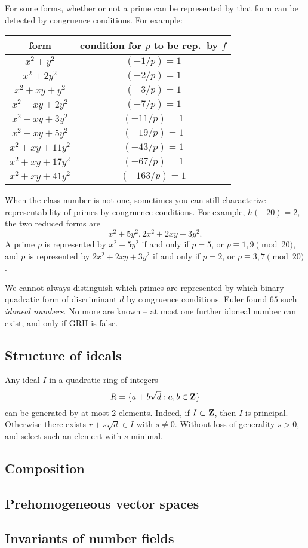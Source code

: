 For some forms, whether or not a prime can be represented by that form can 
be detected by congruence conditions. For example: 
\begin{center}
\begin{tabular}{c|c}
form & condition for $p$ to be rep.~by $f$ \\ \hline
$x^2+y^2$         & $(-1/p)=1$ \\
$x^2+2 y^2$       & $(-2/p)=1$ \\
$x^2+x y+y^2$     & $(-3/p)=1$ \\
$x^2+x y+2 y^2$   & $(-7/p)=1$ \\
$x^2 + x y+3 y^2$ & $(-11/p)=1$ \\
$x^2+x y+5y^2$    & $(-19/p)=1$ \\
$x^2+x y+11y^2$   & $(-43/p)=1$ \\
$x^2+x y+17 y^2$  & $(-67/p)=1$ \\
$x^2+x y+41 y^2$  & $(-163/p)=1$
\end{tabular}
\end{center}

When the class number is not one, sometimes you can still characterize 
representability of primes by congruence conditions. For example, 
$h(-20)=2$, the two reduced forms are 
\[
  x^2+5 y^2 , 2 x^2 + 2 x y+3 y^2.
\]
A prime $p$ is represented by $x^2+ 5 y^2$ if and only if 
$p=5$, or $p\equiv 1,9\pmod{20}$, and $p$ is represented by $2 x^2+2 x y+3 y^2$ 
if and only if $p=2$, or $p\equiv 3,7\pmod{20}$. 

We cannot always distinguish which primes are represented by which binary 
quadratic form of discriminant $d$ by congruence conditions. Euler found 
$65$ such \emph{idoneal numbers}. No more are known -- at most one further 
idoneal number can exist, and only if GRH is false. 





\subsection{Structure of ideals}

Any ideal $I$ in a quadratic ring of integers 
\[
  R=\{a+ b\sqrt d:a,b\in \mathbf{Z}\} 
\]
can be generated by at most 2 elements. Indeed, if $I\subset \mathbf{Z}$, then $I$ is 
principal. Otherwise there exists $r+s \sqrt d\in I$ with $s\ne 0$. Without 
loss of generality $s>0$, and select such an element with $s$ minimal. 





\subsection{Composition}

\subsection{Prehomogeneous vector spaces}

\subsection{Invariants of number fields}


